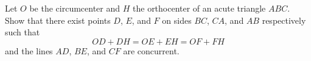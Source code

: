 Let $O$ be the circumcenter and $H$ the orthocenter of an acute triangle $ABC$. Show that there exist points $D$, $E$, and $F$ on sides $BC$, $CA$, and $AB$ respectively such that \[OD+DH=OE+EH=OF+FH\] and the lines $AD$, $BE$, and $CF$ are concurrent.